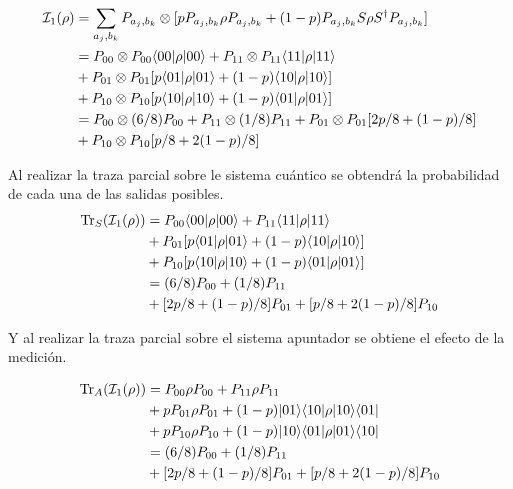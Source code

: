 \begin{equation}\label{primer_alternativa_ejemplo}
    \begin{split}
        \mathcal{I}_1(\rho)&=\sum_{a_j,b_k}P_{a_j,b_k}\otimes[p P_{a_j,b_k}\rho P_{a_j,b_k}+(1-p)P_{a_j,b_k}S\rho S^\dagger P_{a_j,b_k}]\\
        &=P_{00}\otimes P_{00} \langle 00|\rho|00\rangle + P_{11}\otimes P_{11} \langle 11|\rho|11\rangle\\
        &+P_{01} \otimes P_{01}[p \langle 01|\rho|01\rangle+(1-p)\langle 10|\rho|10\rangle]\\
        &+P_{10} \otimes P_{10}[p \langle 10|\rho|10\rangle+(1-p)\langle 01|\rho|01\rangle]\\
        &=P_{00}\otimes (6/8)P_{00} + P_{11}\otimes (1/8)P_{11}+P_{01} \otimes P_{01}[2p/8 +(1-p)/8]\\
        &+P_{10} \otimes P_{10}[p/8+2(1-p)/8]\\
    \end{split}
\end{equation}


Al realizar la traza parcial sobre le sistema cuántico se obtendrá la probabilidad de cada una de las salidas posibles.
\begin{equation}\label{traza_S1_ejemplo1}
    \begin{split}
        {\rm Tr}_S(\mathcal{I}_1(\rho)) &= P_{00} \langle 00|\rho|00\rangle + P_{11} \langle 11|\rho|11\rangle\\
        &+P_{01}[p \langle 01|\rho|01\rangle+(1-p)\langle 10|\rho|10\rangle]\\
        &+P_{10}[p \langle 10|\rho|10\rangle+(1-p)\langle 01|\rho|01\rangle]\\
        &=(6/8)P_{00} + (1/8)P_{11}\\
        &+[2p/8 +(1-p)/8]P_{01}+ [p/8+2(1-p)/8]P_{10}\\
    \end{split}
\end{equation}

Y al realizar la traza parcial sobre el sistema apuntador se obtiene el efecto de la medición.

\begin{equation}\label{traza_A1_ejemplo1}
    \begin{split}
        {\rm Tr}_A(\mathcal{I}_1(\rho)) &= P_{00} \rho P_{00} + P_{11}\rho P_{11}\\
        &+p P_{01}\rho P_{01}+(1-p) |01\rangle \langle 10|\rho|10\rangle \langle01|\\
        &+p P_{10}\rho P_{10}+(1-p) |10\rangle \langle 01|\rho|01\rangle \langle10|\\
        &=(6/8)P_{00} + (1/8)P_{11}\\
        &+[2p/8 +(1-p)/8]P_{01}+ [p/8+2(1-p)/8]P_{10}\\
    \end{split}
\end{equation}


